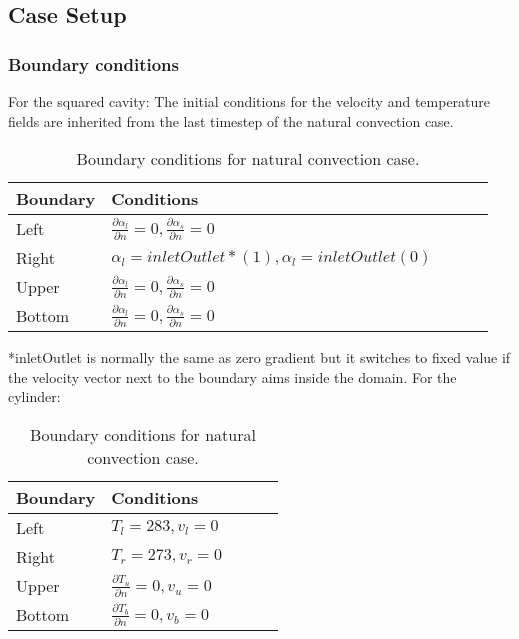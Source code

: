 \subsection{Case Setup}
\subsubsection*{Boundary conditions}

For the squared cavity:
The initial conditions for the velocity and temperature fields are inherited from the last timestep of the natural convection case.
\begin{table}[h!]
	\begin{tabular}{@{}lllll@{}}
		\toprule[1pt]
		\textbf{Boundary} & \textbf{Conditions}  \\ \midrule[2pt]
		Left & $\frac{\partial \alpha_{l}}{\partial n} = 0, \frac{\partial \alpha_{s}}{\partial n} = 0    $  \\
		Right & $\alpha_{l} = inletOutlet* (1), \alpha_{l} = inletOutlet (0) $ \\
		Upper & $\frac{\partial \alpha_{l}}{\partial n} = 0, \frac{\partial \alpha_{s}}{\partial n} = 0$  \\
		Bottom & $\frac{\partial \alpha_{l}}{\partial n} = 0, \frac{\partial \alpha_{s}}{\partial n} = 0 $  \\ \bottomrule[1pt]		
	\end{tabular}
	\centering
	\caption{Boundary conditions for natural convection case.}	
	\label{fig:boundaryCdsCavity}
\end{table}
*inletOutlet is normally the same as zero gradient but it switches to fixed value if the velocity vector next to the boundary aims inside the domain.
For the cylinder:
\begin{table}[h!]
	\begin{tabular}{@{}lllll@{}}
		\toprule[1pt]
		\textbf{Boundary} & \textbf{Conditions}  \\ \midrule[2pt]
		Left & $T_{l}=283, v_{l} = 0   $  \\
		Right & $T_{r}=273, v_{r} = 0 $ \\
		Upper & $\frac{\partial T_{u}}{\partial n} = 0, v_{u} = 0$  \\
		Bottom & $\frac{\partial T_{b}}{\partial n} = 0, v_{b} = 0$  \\ \bottomrule[1pt]		
	\end{tabular}
	\centering
	\caption{Boundary conditions for natural convection case.}	
	\label{fig:boundaryCdsCylinder}
\end{table}
